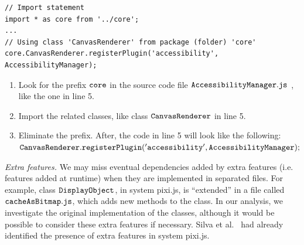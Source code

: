 \documentclass[review]{elsarticle}
\newcommand{\aspas}[1]{{``#1''}}
\newcommand{\mcode}[1]{$\tt #1$}
\begin{document}
\begin{lstlisting}[caption=Example of import statement using wildcard in class \mcode{AccessibilityManager} in system {\sc pixi.js}, label=lst_import_wildcard, emph={[2]graphicsData},emphstyle={[2]\ttfamily\bfseries\color{darkgreen}}]
// Import statement
import * as core from '../core';
...
// Using class 'CanvasRenderer' from package (folder) 'core'
core.CanvasRenderer.registerPlugin('accessibility', AccessibilityManager);

\end{lstlisting} 
\begin{enumerate}
	\item Look for the prefix \mcode{core} in the source code file \mcode{AccessibilityManager.js} , like the one in line 5.
	\item Import the related classes, like class \mcode{CanvasRenderer} in line 5.
	\item Eliminate the prefix. After, the code in line 5 will look like the following:  \mcode{CanvasRenderer.registerPlugin('accessibility',AccessibilityManager);}
\end{enumerate}

\vspace{2.5 mm}

\noindent \textit{Extra features.} We may miss eventual dependencies added by extra features (i.e. features added at runtime) when they are implemented in separated files. For example, class \mcode{DisplayObject}, in system {\sc pixi.js}, is \aspas{extended} in a file called \mcode{cacheAsBitmap.js}, which adds new methods to the class. In our analysis, we investigate the original implementation of the classes, although it would be possible to consider these extra features if necessary. Silva et al.~\cite{icsr2017} had already identified the presence of extra features in system {\sc pixi.js}. 

\end{document}
